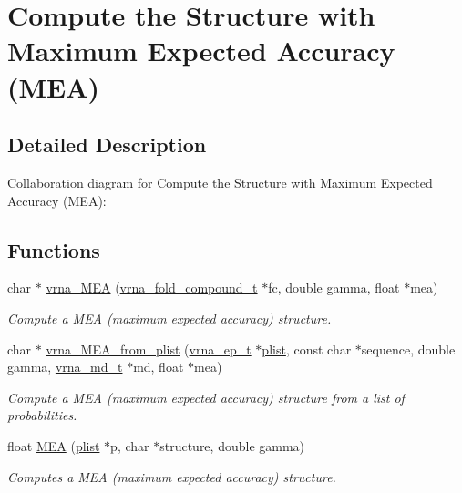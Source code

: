 \hypertarget{group__mea__fold}{}\section{Compute the Structure with Maximum Expected Accuracy (M\+EA)}
\label{group__mea__fold}


\subsection{Detailed Description}
Collaboration diagram for Compute the Structure with Maximum Expected Accuracy (M\+EA)\+:
\subsection*{Functions}
\begin{DoxyCompactItemize}
\item 
char $\ast$ \mbox{\hyperlink{group__mea__fold_ga9b87b664ef014c1266aa50d5bc39f2ac}{vrna\+\_\+\+M\+EA}} (\mbox{\hyperlink{group__fold__compound_ga1b0cef17fd40466cef5968eaeeff6166}{vrna\+\_\+fold\+\_\+compound\+\_\+t}} $\ast$fc, double gamma, float $\ast$mea)
\begin{DoxyCompactList}\small\item\em Compute a M\+EA (maximum expected accuracy) structure. \end{DoxyCompactList}\item 
char $\ast$ \mbox{\hyperlink{group__mea__fold_ga26afeef667f7013a743d1d1ebe42666a}{vrna\+\_\+\+M\+E\+A\+\_\+from\+\_\+plist}} (\mbox{\hyperlink{group__struct__utils__plist_gab9ac98ab55ded9fb90043b024b915aca}{vrna\+\_\+ep\+\_\+t}} $\ast$\mbox{\hyperlink{group__data__structures_ga9608eed021ebfbdd7a901cfdc446c8e9}{plist}}, const char $\ast$sequence, double gamma, \mbox{\hyperlink{group__model__details_ga1f8a10e12a0a1915f2a4eff0b28ea17c}{vrna\+\_\+md\+\_\+t}} $\ast$md, float $\ast$mea)
\begin{DoxyCompactList}\small\item\em Compute a M\+EA (maximum expected accuracy) structure from a list of probabilities. \end{DoxyCompactList}\item 
float \mbox{\hyperlink{group__mea__fold_ga396ec6144c6a74fcbab4cea6b42d76c3}{M\+EA}} (\mbox{\hyperlink{group__data__structures_ga9608eed021ebfbdd7a901cfdc446c8e9}{plist}} $\ast$p, char $\ast$structure, double gamma)
\begin{DoxyCompactList}\small\item\em Computes a M\+EA (maximum expected accuracy) structure. \end{DoxyCompactList}\end{DoxyCompactItemize}


